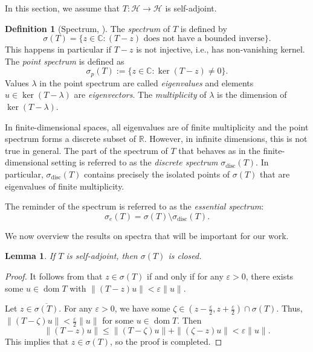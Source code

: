 \documentclass[11pt]{article}
\newtheorem{lemma}[theorem]{Lemma}
\theoremstyle{definition}
\newtheorem{definition}[theorem]{Definition}
\theoremstyle{remark}
\DeclareMathOperator\dom{dom}
\newcommand{\Hh}{\mathcal{H}}
\newcommand{\R}{\mathbb{R}}
\newcommand{\IC}{\mathbb{C}}
\begin{document}
In this section, we assume that $T:\Hh \to \Hh$ is self-adjoint. 

\begin{definition}[Spectrum, \citet{schroedingerop}]
\label{def:spectrum}
    The \emph{spectrum} of $T$ is defined by
    $$
        \sigma(T)=\{z \in \IC: (T-z) \text{ does not have a bounded inverse}  \}.
    $$
    This happens in particular if $T-z$ is not injective, i.e., has non-vanishing kernel. The \emph{point spectrum} is defined as
    $$
        \sigma_p(T):=\{z \in \IC: \ker(T-z)\not=0 \}.
    $$
    Values $\lambda$ in the point spectrum are called \emph{eigenvalues} and elements $u \in \ker(T-\lambda)$ are \emph{eigenvectors}. The \emph{multiplicity} of $\lambda$ is the dimension of $\ker(T-\lambda)$.
\end{definition}
    
    In finite-dimensional spaces, all eigenvalues are of finite multiplicity and the point spectrum forms a discrete subset of $\R$. However, in infinite dimensions, this is not true in general. The part of the spectrum of $T$ that behaves as in the finite-dimensional setting is referred to as the \emph{discrete spectrum} $\sigma_\text{disc}(T)$.  In particular, $\sigma_\text{disc}(T)$ contains precisely the isolated points of $\sigma(T)$ that are eigenvalues of finite multiplicity.
    
    The reminder of the spectrum is referred to as the \emph{essential spectrum}:
    $$
        \sigma_e(T)=\sigma(T) \setminus \sigma_\text{disc}(T).
    $$

We now overview the results on spectra that will be important for our work.

\begin{lemma} \label{cor:saspecclosed}
    If $T$ is self-adjoint, then $\sigma(T)$ is closed.
\end{lemma}
\begin{proof}
    It follows from \citet[Lemma 1.6]{schroedingerop} that $z\in \sigma(T)$ if and only if for any $\varepsilon>0$, there exists some $u\in \dom T$ with $\|(T-z)u\|<\varepsilon\|u\|$.
    
    Let $z\in\overline{\sigma(T)}$. For any $\varepsilon>0$, we have some $\zeta\in (z-\frac{\varepsilon}{2},z+\frac{\varepsilon}{2}) \cap \sigma(T)$. Thus, $\|(T-\zeta)u\|<\frac{\varepsilon}{2}\|u\|$ for some $u\in \dom T$. Then
    $$
    \|(T-z)u\|\leq \|(T-\zeta)u\|+\|(\zeta-z)u\|<  \varepsilon\|u\|.
    $$
    This implies that $z\in\sigma(T)$, so the proof is completed.
\end{proof}
\end{document}
